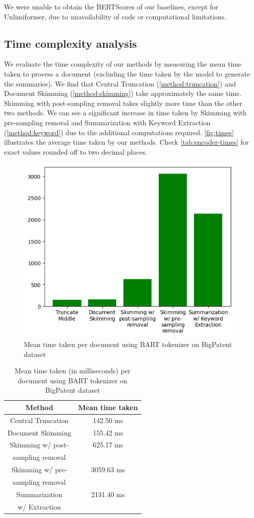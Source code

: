 We were unable to obtain the BERTScores of our baselines, except for Unlimiformer, due to unavailability of code or computational limitations.


\subsection*{Time complexity analysis}

We evaluate the time complexity of our methods by measuring the mean time taken to process a document (excluding the time taken by the model to generate the summaries).
We find that Central Truncation (\autoref{method:truncation}) and Document Skimming (\autoref{method:skimming}) take approximately the same time.
Skimming with post-sampling removal takes slightly more time than the other two methods.
We can see a significant increase in time taken by Skimming with pre-sampling removal and Summarization with Keyword Extraction (\autoref{method:keyword}) due to the additional computations required.
\autoref{fig:times} illustrates the average time taken by our methods.
Check \autoref{tab:encoder-times} for exact values rounded off to two decimal places.

\begin{figure}[!ht]
  \centering
  \includegraphics[width=.48\textwidth]{images/encoder-times.png}
  \caption{Mean time taken per document using BART tokenizer on BigPatent dataset}
  \label{fig:times}
\end{figure}

\begin{table}[!ht]
  \centering

  \begin{tabular}{c c}
    \hline
    Method & Mean time taken \\
    \hline
    Central Truncation & 142.50 ms \\
    Document Skimming & 155.42 ms \\
    Skimming w/ post- & 625.17 ms \\
    sampling removal & \\
    Skimming w/ pre- & 3059.63 ms \\
    sampling removal & \\
    Summarization & 2131.40 ms \\
    w/ Extraction & \\
    \hline
  \end{tabular}

  \caption{Mean time taken (in milliseconds) per document using BART tokenizer on BigPatent
  dataset}
  \label{tab:encoder-times}
\end{table}
